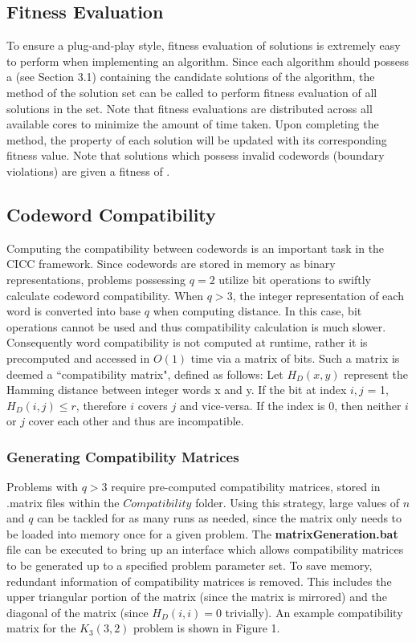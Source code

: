 \documentclass[titlepage]{article}
\begin{document}
\subsection{Fitness Evaluation}

To ensure a plug-and-play style, fitness evaluation of solutions is extremely easy to perform when implementing an algorithm. Since each algorithm should possess a  (see Section 3.1) containing the candidate solutions of the algorithm, the  method of the solution set can be called to perform fitness evaluation of all solutions in the set. Note that fitness evaluations are distributed across all available cores to minimize the amount of time taken. Upon completing the  method, the  property of each solution will be updated with its corresponding fitness value. Note that solutions which possess invalid codewords (boundary violations) are given a fitness of .

\subsection{Codeword Compatibility}

Computing the compatibility between codewords is an important task in the CICC framework. Since codewords are stored in memory as binary representations, problems possessing $q = 2$ utilize bit operations to swiftly calculate codeword compatibility. When $q > 3$, the integer representation of each word is converted into base $q$ when computing distance. In this case, bit operations cannot be used and thus compatibility calculation is much slower. Consequently word compatibility is not computed at runtime, rather it is precomputed and accessed in $O(1)$ time via a matrix of bits. Such a matrix is deemed a ``compatibility matrix", defined as follows: Let $H_D(x,y)$ represent the Hamming distance between integer words x and y. If the bit at index $i,j$ = 1, $H_D(i,j) \leq r$, therefore $i$ covers $j$ and vice-versa. If the index is 0, then neither $i$ or $j$ cover each other and thus are incompatible.

\subsubsection{Generating Compatibility Matrices}

Problems with $q>3$ require pre-computed compatibility matrices, stored in .matrix files within the $Compatibility$ folder. Using this strategy, large values of $n$ and $q$ can be tackled for as many runs as needed, since the matrix only needs to be loaded into memory once for a given problem. The \textbf{matrixGeneration.bat} file can be executed to bring up an interface which allows compatibility matrices to be generated up to a specified problem parameter set. To save memory, redundant information of compatibility matrices is removed. This includes the upper triangular portion of the matrix (since the matrix is mirrored) and the diagonal of the matrix (since $H_D(i,i) = 0$ trivially). An example compatibility matrix for the $K_3(3,2)$ problem is shown in Figure 1.
\end{document}
